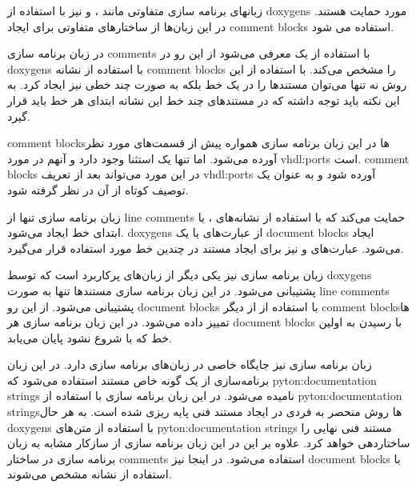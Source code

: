 \begin{ebox}%
زبانهای برنامه سازی متفاوتی مانند ،  و  نیز با
استفاده از \glspl{doxygen} مورد حمایت هستند. در این زبان‌ها از ساختارهای متفاوتی
برای ایجاد \glspl{comment block} استفاده می شود.

در زبان برنامه سازی  \glspl{comment} با استفاده از یک \lr{-} معرفی
می‌شود از این رو در \glspl{doxygen} با استفاده از نشانه \lr{-!} \glspl{comment
block} را مشخص می‌کند. با استفاده از این روش نه تنها می‌توان مستندها را در یک خط
بلکه به صورت چند خطی نیز ایجاد کرد. به این نکته باید توجه داشته که در مستندهای
چند خط این نشانه ابتدای هر خط باید قرار گیرد.

\glspl{comment block}ها در این زبان برنامه سازی همواره پیش از قسمت‌های مورد نظر
آورده می‌شود. اما تنها یک استثنا وجود دارد و آنهم در مورد \glspl{vhdl:port} است.
\glspl{comment block} در این مورد می‌تواند بعد از تعریف \glspl{vhdl:port}
آورده شود و به عنوان یک توصیف کوتاه از آن در نظر گرفته شود.


زبان برنامه سازی  تنها از \glspl{line comment} حمایت می‌کند که با
استفاده از نشانه‌های \lr{*}،  یا \lr{!} ابتدای خط ایجاد می‌شود.
\glspl{doxygen} از عبارت‌های \lr{!>} یا \lr{!<} یک \glspl{document block} ایجاد
می‌شود. عبارت‌های \lr{!>}‌و \lr{!!} نیز برای ایجاد مستند در چندین خط مورد
استفاده قرار می‌گیرد.

زبان برنامه سازی  نیز یکی دیگر از زبان‌های پرکاربرد است که توسط
\glspl{doxygen} پشتیبانی می‌شود. در این زبان برنامه سازی مستندها تنها به صورت
\glspl{line comment} پشتیبانی می‌شود. از این رو \glspl{document block} با
استفاده از \lr{\#\#} از دیگر \glspl{comment block}ها تمییز داده می‌شود. در این
زبان برنامه سازی هر \glspl{document block} با رسیدن به اولین خط که با \lr{\#}
شروع نشود پایان می‌یابد.

زبان برنامه سازی  نیز جایگاه خاصی در زبان‌های برنامه سازی دارد. در
این زبان برنامه‌سازی از یک گونه خاص مستند استفاده می‌شود که
\glspl{pyton:documentation string} نامیده می‌شود. در این زبان برنامه سازی با
استفاده از \glspl{pyton:documentation string}ها روش منحصر به فردی در ایجاد مستند
فنی پایه ریزی شده است. به هر حال \glspl{doxygen} با استفاده از متن‌های
\glspl{pyton:documentation string} مستند فنی نهایی را ساختاردهی خواهد کرد. علاوه
بر این در این زبان برنامه سازی از سازکار مشابه به زبان برنامه سازی  در
ساختار \glspl{comment} استفاده می‌شود. در اینجا نیز \glspl{document block} با
استفاده از نشانه \lr{\#\#} مشخص می‌شوند.
\end{ebox}

